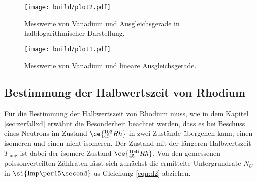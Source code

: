 

\begin{figure}[ht!]
  \centering
  \texttt{[image: build/plot2.pdf]}
  \caption{Messwerte von Vanadium und Ausgleichsgerade in halblogarithmischer Darstellung.}
  \label{fig:plot2}
\end{figure}
\begin{figure}[ht!]
  \centering
  \texttt{[image: build/plot1.pdf]}
  \caption{Messwerte von Vanadium und lineare Ausgleichsgerade.}
  \label{fig:plot1}
\end{figure}

\subsection{Bestimmung der Halbwertszeit von Rhodium}
Für die Bestimmung der Halbwertszeit von Rhodium muss, wie in dem Kapitel \ref{sec:zerfallxd} erwähnt die Besonderheit beachtet werden, dass es bei Beschuss eines Neutrons
im Zustand $\ce{^{103}_{45}Rh}$ in zwei Zustände übergehen kann, einen isomeren und einen nicht isomeren. Der Zustand mit der längeren Halbwertszeit $T_{\text{lang}}$
ist dabei der isomere Zustand $\ce{^{104{\text{i}}}_{45}Rh}$. Von den gemessenen poissonverteilten Zählraten lässt sich zunächst die ermittelte Untergrundrate $N_{U}$ in $\si{{\text{Imp\per}{15}}\second}$ 
us Gleichung \ref{eqn:d2} abziehen.

